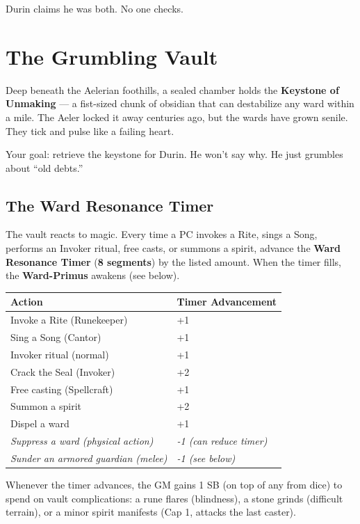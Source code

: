 \documentclass[11pt, a4paper]{article}
\begin{document}
Durin claims he was both. No one checks.

\section{The Grumbling Vault}

Deep beneath the Aelerian foothills, a sealed chamber holds the \textbf{Keystone of Unmaking} --- a fist-sized chunk of obsidian that can destabilize any ward within a mile. The Aeler locked it away centuries ago, but the wards have grown senile. They tick and pulse like a failing heart.

Your goal: retrieve the keystone for Durin. He won't say why. He just grumbles about ``old debts.''

\subsection{The Ward Resonance Timer }

The vault reacts to magic. Every time a PC invokes a Rite, sings a Song, performs an Invoker ritual, free casts, or summons a spirit, advance the \textbf{Ward Resonance Timer } (\textbf{8 segments}) by the listed amount. When the timer fills, the \textbf{Ward-Primus} awakens (see below).

\begin{table}[h]
\centering
\begin{tabularx}{\linewidth}{l X}
\toprule
\textbf{Action} & \textbf{Timer Advancement} \\
\midrule
Invoke a Rite (Runekeeper) & +1 \\
Sing a Song (Cantor) & +1 \\
Invoker ritual (normal) & +1 \\
Crack the Seal (Invoker) & +2 \\
Free casting (Spellcraft) & +1 \\
Summon a spirit & +2 \\
Dispel a ward & +1 \\
\midrule
\textit{Suppress a ward (physical action)} & \textit{-1 (can reduce timer)} \\
\textit{Sunder an armored guardian (melee)} & \textit{-1 (see below)} \\
\bottomrule
\end{tabularx}
\end{table}

Whenever the timer advances, the GM gains 1 SB (on top of any from dice) to spend on vault complications: a rune flares (blindness), a stone grinds (difficult terrain), or a minor spirit manifests (Cap 1, attacks the last caster).
\end{document}
